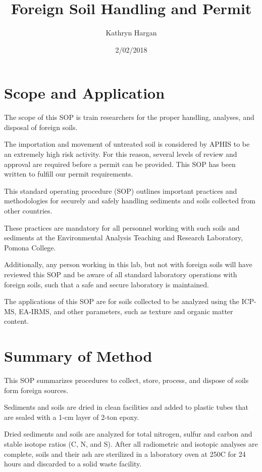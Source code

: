 \documentclass[12pt]{../SOP3}\usepackage[]{graphicx}\usepackage[]{color}
\title{Foreign Soil Handling and Permit}
\date{2/02/2018}
\author{Kathryn Hargan}
\begin{document}
\maketitle

\section{Scope and Application}

\NP The scope of this SOP is train researchers for the proper handling, analyses, and disposal of foreign soils. 

\NP The importation and movement of untreated soil is considered by APHIS to be an extremely high risk activity. For this reason, several levels of review and approval are required before a permit can be provided. This SOP has been written to fulfill our permit requirements.

\NP This standard operating procedure (SOP) outlines important practices and methodologies for securely and safely handling sediments and soils collected from other countries. 

\NP These practices are mandatory for all personnel working with such soils and sediments at the Environmental Analysis Teaching and Research Laboratory, Pomona College. 

\NP Additionally, any person working in this lab, but not with foreign soils will have reviewed this SOP and be aware of all standard laboratory operations with foreign soils, such that a safe and secure laboratory is maintained.  

\NP The applications of this SOP are for soils collected to be analyzed using the ICP-MS, EA-IRMS, and other parameters, such as texture and organic matter content. 

\section{Summary of Method}

\NP This SOP summarizes procedures to collect, store, process, and dispose of soils form foreign sources. 

\NP Sediments and soils are dried in clean facilities and added to plastic tubes that are sealed with a 1-cm layer of 2-ton epoxy. 

\NP Dried sediments and soils are analyzed for total nitrogen, sulfur and carbon and stable isotope ratios (C, N, and S). After all radiometric and isotopic analyses are complete, soils and their ash are sterilized in a laboratory oven at 250\degree C for 24 hours and discarded to a solid waste facility.
\end{document}
